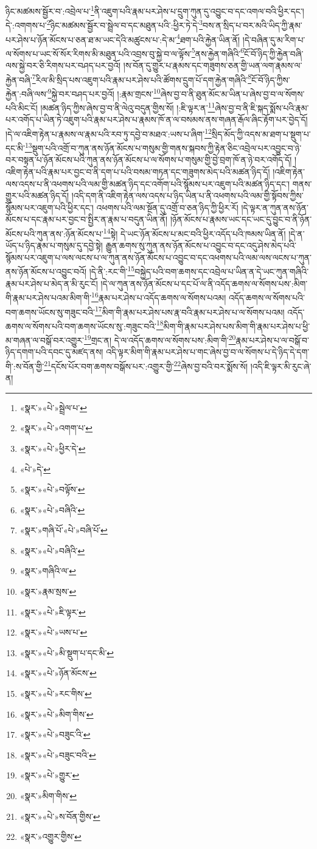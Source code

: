 ཉིང་མཚམས་སྦྱོར་བ་:འབྲེལ་པ་\footnote{«སྣར་»«པེ་»སྦྲེལ་པ་}ནི་འཇུག་པའི་རྣམ་པར་ཤེས་པ་དྲུག་ཀུན་དུ་འབྱུང་བ་དང་འགལ་བའི་ཕྱིར་དང་། དེ་:འགགས་པ་\footnote{«སྣར་»«པེ་»འགག་པ་}ཉིང་མཚམས་སྦྱོར་བ་སྦྲེལ་བ་དང་མཐུན་པའི་:ཕྱིར་ཏེ་དེ་\footnote{«སྣར་»«པེ་»ཕྱིར་དེ་}བས་ན་སྲིད་པ་བར་མའི་ཡིད་ཀྱི་རྣམ་པར་ཤེས་པ་ཉོན་མོངས་པ་ཅན་ཐ་མ་ཡང་དེའི་མཚུངས་པ་:དེ་མ་\footnote{«པེ་»དེ་}ཐག་པའི་རྐྱེན་ཡིན་ནོ། །དེ་བཞིན་དུ་མ་རིག་པ་ལ་སོགས་པ་ཡང་སོ་སོར་རིགས་མི་མཐུན་པའི་འབྲས་བུ་སྐྱེ་བ་ལ་ལྟོས་\footnote{«སྣར་»«པེ་»བལྟོས་}ནས་རྐྱེན་གཞིའི་\footnote{«སྣར་»«པེ་»བཞིའི་}ངོ་བོ་ཉིད་ཀྱི་རྐྱེན་བཞི་ལས་སྐྱེ་བར་ཅི་རིགས་པར་བཤད་པར་བྱའོ། །ས་བོན་དུ་གྱུར་པ་རྣམས་དང་གཟུགས་ཅན་གྱི་ཡན་ལག་རྣམས་ལ་རྐྱེན་བཞི་\footnote{«སྣར་»གཞི་པོ་«པེ་»བཞི་པོ་}རིལ་མི་སྲིད་པས་འཇུག་པའི་རྣམ་པར་ཤེས་པའི་ཚོགས་དྲུག་པོ་དག་རྐྱེན་གཞིའི་\footnote{«སྣར་»«པེ་»བཞིའི་}ངོ་བོ་ཉིད་ཀྱིས་རྐྱེན་:བཞི་ལས་\footnote{«སྣར་»གཞིའི་ལ་}སྐྱེ་བར་བཤད་པར་བྱའོ། །:རྣམ་གྲངས་\footnote{«སྣར་»རྣམ་སྲས་}ཞེས་བྱ་བ་ནི་ཐུན་མོང་མ་ཡིན་པ་ཞེས་བྱ་བ་ལ་སོགས་པའི་མིང་ངོ། །མཚན་ཉིད་ཀྱིས་ཞེས་བྱ་བ་ནི་ལེའུ་བདུན་གྱིས་སོ། །:ཇི་ལྟར་ན་\footnote{«སྣར་»«པེ་»ཇི་ལྟར་}ཞེས་བྱ་བ་ནི་ཇི་སྐད་སྨོས་པའི་རྣམ་པར་འགོད་པ་ཡིན་ཏེ་འཇུག་པའི་རྣམ་པར་ཤེས་པ་རྣམས་ཁོ་ན་ལ་བསམས་ནས་གཞན་རྒོལ་ཞིང་རྟོག་པར་བྱེད་དོ། །དེ་ལ་འཇིག་རྟེན་པ་རྣམས་ལ་རྣམ་པའི་རབ་ཏུ་དབྱེ་བ་མཐའ་:ཡས་པ་ཞིག་\footnote{«སྣར་»«པེ་»ཡས་པ་}སྲིད་མོད་ཀྱི་འདས་མ་ཐག་པ་སྡུག་པ་དང་མི་\footnote{«སྣར་»«པེ་»མི་སྡུག་པ་དང་མི་}སྡུག་པའི་འགྲོ་བ་ཀུན་ནས་ཉོན་མོངས་པ་གསུམ་གྱི་གནས་སྐབས་ཀྱི་རྟེན་ཅིང་འབྲེལ་པར་འབྱུང་བ་ཉེ་བར་བསྟན་པ་ཉོན་མོངས་པའི་ཀུན་ནས་ཉོན་མོངས་པ་ལ་སོགས་པ་གསུམ་གྱི་བྱེ་བྲག་ཁོ་ན་ཉེ་བར་འགོད་དོ། །འཇིག་རྟེན་པའི་རྣམ་པར་བྱང་བ་ནི་དག་པ་པའི་བསམ་གཏན་དང་གཟུགས་མེད་པའི་མཚན་ཉིད་དོ། །འཇིག་རྟེན་ལས་འདས་པ་ནི་འཕགས་པའི་ལམ་གྱི་མཚན་ཉིད་དང་འགོག་པའི་སྙོམས་པར་འཇུག་པའི་མཚན་ཉིད་དང་། གནས་གྱུར་པའི་མཚན་ཉིད་དོ། །འདི་དག་ནི་འཇིག་རྟེན་ལས་འདས་པ་ཉིད་ཡིན་པ་ནི་འཕགས་པའི་ལམ་གྱི་སྟོབས་ཀྱིས་སྙོམས་པར་འཇུག་པའི་ཕྱིར་དང་། འཕགས་པའི་ལམ་སྔོན་དུ་འགྲོ་བ་ཅན་ཉིད་ཀྱི་ཕྱིར་རོ། །དེ་ལྟར་ན་ཀུན་ནས་ཉོན་མོངས་པ་དང་རྣམ་པར་བྱང་བ་སྤྱིར་ན་རྣམ་པ་བདུན་ཡིན་ནོ། །ཉོན་མོངས་པ་རྣམས་ཡང་དང་ཡང་དུ་བྱུང་བ་ནི་ཉོན་མོངས་པའི་ཀུན་ནས་:ཉོན་མོངས་པ་\footnote{«སྣར་»«པེ་»ཉོན་མོངས་}སྟེ། དེ་ཡང་ཉོན་མོངས་པ་མང་བའི་ཕྱིར་འདོད་པའི་ཁམས་ཡིན་ནོ། །དེ་ན་ཡོད་པ་ཉིད་རྣམ་པ་གསུམ་དུ་དབྱེ་སྟེ། རྒྱུན་ཆགས་སུ་ཀུན་ནས་ཉོན་མོངས་པ་འབྱུང་བ་དང་འདུ་ཤེས་མེད་པའི་སྙོམས་པར་འཇུག་པ་ལས་ལངས་པ་ལ་ཀུན་ནས་ཉོན་མོངས་པ་འབྱུང་བ་དང་འཕགས་པའི་ལམ་ལས་ལངས་པ་ཀུན་ནས་ཉོན་མོངས་པ་འབྱུང་བའོ། །དེ་ནི་:རང་གི་\footnote{«སྣར་»«པེ་»རང་གིས་}བསྐྱེད་པའི་བག་ཆགས་དང་འབྲེལ་པ་ཡིན་ན་དེ་ཡང་ཀུན་གཞིའི་རྣམ་པར་ཤེས་པ་མེད་ན་མི་རུང་ངོ། །དེ་ལ་ཀུན་ནས་ཉོན་མོངས་པ་དང་པོ་ལ་ནི་འདོད་ཆགས་ལ་སོགས་པས་:མིག་གི་རྣམ་པར་ཤེས་པའམ་མིག་གི་\footnote{«སྣར་»«པེ་»མིག་གིས་}རྣམ་པར་ཤེས་པ་འདོད་ཆགས་ལ་སོགས་པའམ། འདོད་ཆགས་ལ་སོགས་པའི་བག་ཆགས་ཡོངས་སུ་གཟུང་བའི་\footnote{«སྣར་»«པེ་»བཟུང་འི་}མིག་གི་རྣམ་པར་ཤེས་པས་རྣ་བའི་རྣམ་པར་ཤེས་པ་ལ་སོགས་པའམ། འདོད་ཆགས་ལ་སོགས་པའི་བག་ཆགས་ཡོངས་སུ་:གཟུང་བའི་\footnote{«སྣར་»«པེ་»བཟུང་བའི་}མིག་གི་རྣམ་པར་ཤེས་པས་མིག་གི་རྣམ་པར་ཤེས་པ་ཕྱི་མ་གཞན་ལ་བསྒོ་བར་འགྱུར་\footnote{«སྣར་»«པེ་»གྱུར་}གྲང་ན། དེ་ལ་འདོད་ཆགས་ལ་སོགས་པས་:མིག་གི་\footnote{«སྣར་»མིག་གིས་}རྣམ་པར་ཤེས་པ་ལ་བསྒོ་བ་ཉིད་དགག་པའི་དབང་དུ་མཛད་ནས། འདི་ལྟར་མིག་གི་རྣམ་པར་ཤེས་པ་གང་ཞེས་བྱ་བ་ལ་སོགས་པ་དེ་ཉིད་དེ་དག་གི་:ས་བོན་གྱི་\footnote{«སྣར་»«པེ་»ས་བོན་གྱིས་}དངོས་པོར་བག་ཆགས་བསྒོས་པར་:འགྱུར་གྱི་\footnote{«སྣར་»འགྱུར་གྱིས་}ཞེས་བྱ་བའི་བར་སྨོས་སོ། །འདི་ཇི་ལྟར་མི་རུང་ཞེ་ན། 